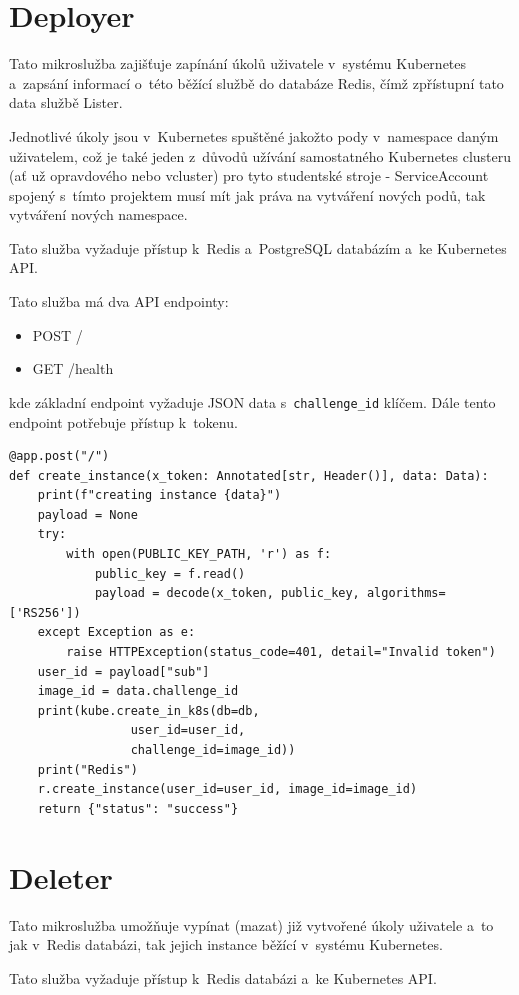 \documentclass[12pt, a4paper,
oneside,      %
openright
]{report}
\begin{document}
\section{Deployer}
Tato mikroslužba zajišťuje zapínání úkolů uživatele v~systému Kubernetes a~zapsání informací o~této běžící službě do databáze Redis, čímž zpřístupní tato data službě Lister.

Jednotlivé úkoly jsou v~Kubernetes spuštěné jakožto pody v~namespace daným uživatelem, což je také jeden z~důvodů užívání samostatného Kubernetes clusteru (ať už opravdového nebo vcluster) pro tyto studentské stroje - ServiceAccount  spojený s~tímto projektem musí mít jak práva na vytváření nových podů, tak vytváření nových namespace.

Tato služba vyžaduje přístup k~Redis a~PostgreSQL databázím a~ke Kubernetes API.

Tato služba má dva API endpointy:
\begin{itemize}
	\item POST /
	\item GET /health
\end{itemize}
kde základní endpoint vyžaduje JSON data s~\texttt{challenge\_id} klíčem. Dále tento endpoint potřebuje přístup k~tokenu.

\begin{lstlisting}[style=Python, caption=Ukázka kódu pro vytvoření instance]
@app.post("/")
def create_instance(x_token: Annotated[str, Header()], data: Data):
    print(f"creating instance {data}")
    payload = None
    try:
        with open(PUBLIC_KEY_PATH, 'r') as f:
            public_key = f.read()
            payload = decode(x_token, public_key, algorithms=['RS256'])
    except Exception as e:
        raise HTTPException(status_code=401, detail="Invalid token")
    user_id = payload["sub"]
    image_id = data.challenge_id
    print(kube.create_in_k8s(db=db, 
			     user_id=user_id, 
			     challenge_id=image_id))
    print("Redis")
    r.create_instance(user_id=user_id, image_id=image_id)
    return {"status": "success"}
\end{lstlisting}

\section{Deleter}
Tato mikroslužba umožňuje vypínat (mazat) již vytvořené úkoly uživatele a~to jak v~Redis databázi, tak jejich instance běžící v~systému Kubernetes.

Tato služba vyžaduje přístup k~Redis databázi a~ke Kubernetes API.
\end{document}
